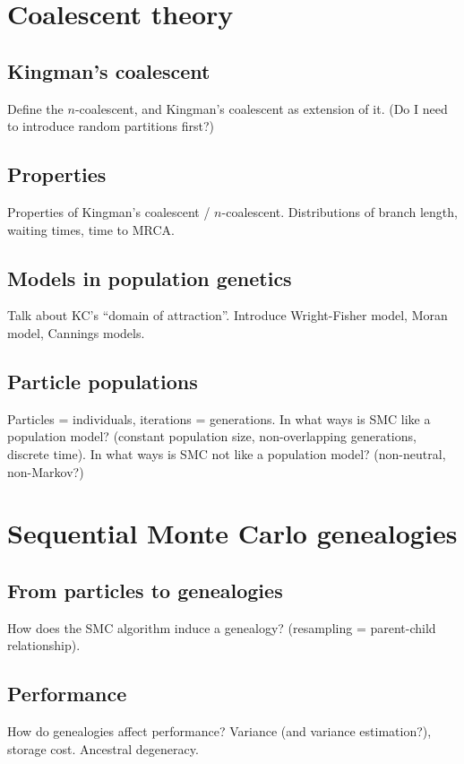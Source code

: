 \section{Coalescent theory}

\subsection{Kingman's coalescent}
Define the $n$-coalescent, and Kingman's coalescent as extension of it. (Do I need to introduce random partitions first?)

\subsection{Properties}
Properties of Kingman's coalescent / $n$-coalescent. Distributions of branch length, waiting times, time to MRCA.

\subsection{Models in population genetics}
Talk about KC's ``domain of attraction''. Introduce Wright-Fisher model, Moran model, Cannings models.

\subsection{Particle populations}
Particles = individuals, iterations = generations. In what ways is SMC like a population model? (constant population size, non-overlapping generations, discrete time). In what ways is SMC not like a population model? (non-neutral, non-Markov?)


\section{Sequential Monte Carlo genealogies}

\subsection{From particles to genealogies}
How does the SMC algorithm induce a genealogy? (resampling = parent-child relationship). 

\subsection{Performance}
How do genealogies affect performance? Variance (and variance estimation?), storage cost. Ancestral degeneracy.

